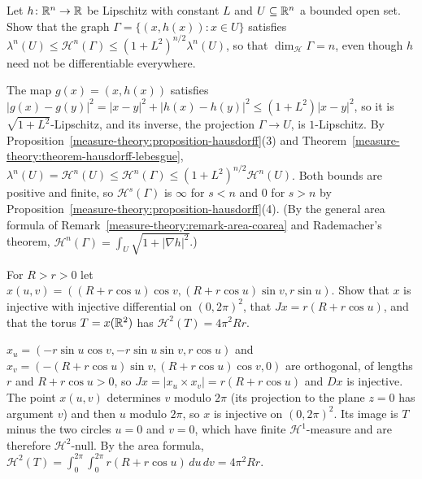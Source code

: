 \begin{exercise}\label{measure-theory:exercise-lipschitz-graph}
Let $h \colon \mathbb{R}^n \to \mathbb{R}$ be Lipschitz with constant $L$ and $U \subseteq \mathbb{R}^n$ a bounded open set. Show that the graph $\Gamma = \{(x, h(x)) : x \in U\}$ satisfies
$\lambda^n(U) \leq \mathcal{H}^n(\Gamma) \leq (1 + L^2)^{n/2}\lambda^n(U)$, so that $\dim_{\mathcal{H}}\Gamma = n$, even though $h$ need not be differentiable everywhere.
\end{exercise}

\begin{solution}
The map $g(x) = (x, h(x))$ satisfies $|g(x) - g(y)|^2 = |x - y|^2 + |h(x) - h(y)|^2 \leq (1 + L^2)|x - y|^2$, so it is $\sqrt{1 + L^2}$-Lipschitz, and its inverse, the projection
$\Gamma \to U$, is $1$-Lipschitz. By Proposition~\ref{measure-theory:proposition-hausdorff}(3) and Theorem~\ref{measure-theory:theorem-hausdorff-lebesgue},
$\lambda^n(U) = \mathcal{H}^n(U) \leq \mathcal{H}^n(\Gamma) \leq (1 + L^2)^{n/2}\mathcal{H}^n(U)$. Both bounds are positive and finite, so $\mathcal{H}^s(\Gamma)$ is $\infty$ for $s < n$ and $0$ for
$s > n$ by Proposition~\ref{measure-theory:proposition-hausdorff}(4). (By the general area formula of Remark~\ref{measure-theory:remark-area-coarea} and Rademacher's theorem,
$\mathcal{H}^n(\Gamma) = \int_U\sqrt{1 + |\nabla h|^2}$.)
\end{solution}

\begin{exercise}\label{measure-theory:exercise-torus-area}
For $R > r > 0$ let $x(u, v) = ((R + r\cos u)\cos v, (R + r\cos u)\sin v, r\sin u)$. Show that $x$ is injective with injective differential on $(0, 2\pi)^2$, that $Jx = r(R + r\cos u)$, and that
the torus $T = x(\mathbb{R}^2)$ has $\mathcal{H}^2(T) = 4\pi^2Rr$.
\end{exercise}

\begin{solution}
$x_u = (-r\sin u\cos v, -r\sin u\sin v, r\cos u)$ and $x_v = (-(R + r\cos u)\sin v, (R + r\cos u)\cos v, 0)$ are orthogonal, of lengths $r$ and $R + r\cos u > 0$, so
$Jx = |x_u \times x_v| = r(R + r\cos u)$ and $Dx$ is injective. The point $x(u, v)$ determines $v$ modulo $2\pi$ (its projection to the plane $z = 0$ has argument $v$) and then $u$ modulo
$2\pi$, so $x$ is injective on $(0, 2\pi)^2$. Its image is $T$ minus the two circles $u = 0$ and $v = 0$, which have finite $\mathcal{H}^1$-measure and are therefore $\mathcal{H}^2$-null. By the area
formula, $\mathcal{H}^2(T) = \int_0^{2\pi}\int_0^{2\pi}r(R + r\cos u)\,du\,dv = 4\pi^2Rr$.
\end{solution}

